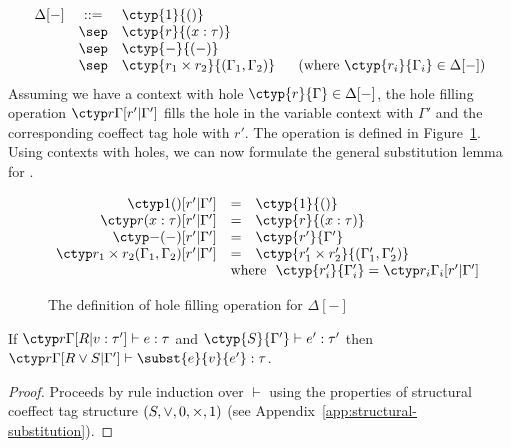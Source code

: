 \begin{equation*}
\begin{array}{rcl}
\Delta[-] &::=& \ctyp{1}{()} \\
       & \sep & \ctyp{r}{(x:\tau)}\\
       & \sep & \ctyp{-}{(-)} \\
       & \sep & \ctyp{r_1 \csprd r_2}{(\Gamma_1, \Gamma_2)}\quad~~(\textnormal{where}~\ctyp{r_i}{\Gamma_i} \in \Delta[-])\\
\end{array}
\end{equation*}
%
Assuming we have a context with hole $\ctyp{r}{\Gamma} \in \Delta[-]$, the hole filling 
operation $\chole{r}{\Gamma}{r'}{\Gamma'}$ fills the hole in the variable context with 
$\Gamma'$ and the corresponding coeffect tag hole with $r'$. The operation is defined in 
Figure~\ref{fig:structural-hole-fill}. Using contexts with holes, we can now formulate the
general substitution lemma for \clstr.

\begin{figure}

\begin{equation*}
\begin{array}{rcl}
                              \chole{1}{()}{r'}{\Gamma'} &=& \ctyp{1}{()}\\
                        \chole{r}{(x:\tau)}{r'}{\Gamma'} &=& \ctyp{r}{(x:\tau)}\\
                             \chole{-}{(-)}{r'}{\Gamma'} &=& \ctyp{r'}{\Gamma'}\\
\chole{r_1 \csprd r_2}{(\Gamma_1, \Gamma_2)}{r'}{\Gamma'} &=& \ctyp{r_1' \csprd r_2'}{(\Gamma_1', \Gamma_2')}\\
&\multicolumn{2}{l} {
  \textnormal{where}~~\ctyp{r_i'}{\Gamma_i'} = \chole{r_i}{\Gamma_i}{r'}{\Gamma'}
}
\end{array}
\end{equation*}
\caption{The definition of hole filling operation for $\Delta[-]$}
\label{fig:structural-hole-fill}
\vspace{-2em}
\end{figure}

\begin{lemma}
\label{thm:structural-subst}
If $\chole{r}{\Gamma}{R}{v:\tau'} \vdash e : \tau$ and $\ctyp{S}{\Gamma'} \vdash e' : \tau'$
then $\chole{r}{\Gamma}{R \csvop S}{\Gamma'} \vdash \subst{e}{v}{e'} : \tau$.
\end{lemma} 
\begin{proof}
Proceeds by rule induction over $\vdash$ using the properties of structural coeffect tag structure
$(S, \vee, 0, \times, 1)$ (see Appendix~\ref{app:structural-substitution}).
\end{proof}

